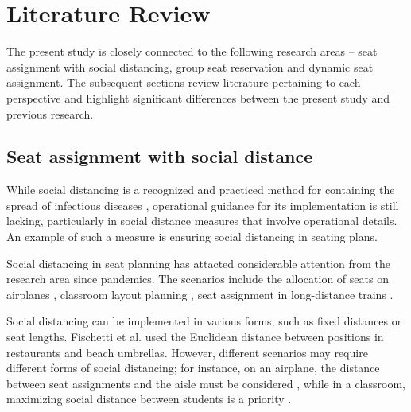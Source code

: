 \section{Literature Review}

The present study is closely connected to the following research areas -- seat assignment with social distancing, group seat reservation and dynamic seat assignment. The subsequent sections review literature pertaining to each perspective and highlight significant differences between the present study and previous research.

\subsection{Seat assignment with social distance}
While social distancing is a recognized and practiced method for containing the spread of infectious diseases \cite{moosa2020effectiveness}, operational guidance for its implementation is still lacking, particularly in social distance measures that involve operational details. An example of such a measure is ensuring social distancing in seating plans.


Social distancing in seat planning has attacted considerable attention from the research area since pandemics. The scenarios include the allocation of seats on airplanes \cite{ghorbani2020model}, classroom layout planning \cite{bortolete2022support}, seat assignment in long-distance trains \cite{haque2022optimization}. 


Social distancing can be implemented in various forms, such as fixed distances or seat lengths. Fischetti et al.\cite{fischetti2021safe} used the Euclidean distance between positions in restaurants and beach umbrellas. However, different scenarios may require different forms of social distancing; for instance, on an airplane, the distance between seat assignments and the aisle must be considered \cite{salari2022social}, while in a classroom, maximizing social distance between students is a priority \cite{bortolete2022support}.






